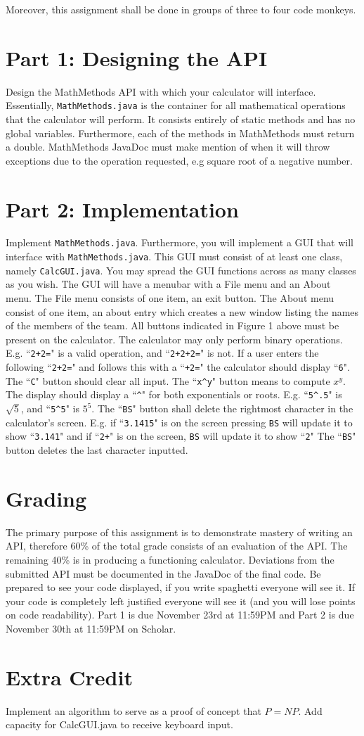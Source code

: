 \documentclass[]{simple}
\begin{document}
Moreover, this assignment shall be done in groups of three to four code monkeys.

\section{Part 1: Designing the API}
Design the MathMethods API with which your calculator will interface.
Essentially, \verb|MathMethods.java| is the container for all mathematical operations that the calculator will perform.
It consists entirely of static methods and has no global variables.
Furthermore, each of the methods in MathMethods must return a double.
MathMethods JavaDoc must make mention of when it will throw exceptions due to the operation requested, e.g square root of a negative number.

\section{Part 2: Implementation}
Implement \verb|MathMethods.java|.
Furthermore, you will implement a GUI that will interface with \verb|MathMethods.java|.
This GUI must consist of at least one class, namely \verb|CalcGUI.java|.
You may spread the GUI functions across as many classes as you wish.
The GUI will have a menubar with a File menu and an About menu.
The File menu consists of one item, an exit button.
The About menu consist of one item, an about entry which creates a new window listing the names of the members of the team.
All buttons indicated in Figure 1 above must be present on the calculator.
The calculator may only perform binary operations. 
E.g. ``\verb|2+2=|" is a valid operation, and ``\verb|2+2+2=|" is not.
If a user enters the following ``\verb|2+2=|" and follows this with a ``\verb|+2=|" the calculator should display ``\verb|6|".
The ``\verb|C|" button should clear all input.
The ``\verb|x^y|" button means to compute $x^y$.
The display should display a ``\verb|^|" for both exponentials or roots.
E.g. ``\verb|5^.5|" is $\sqrt{5}$, and ``\verb|5^5|" is $5^{5}$.
The ``\verb|BS|" button shall delete the rightmost character in the calculator's screen.
E.g. if ``\verb|3.1415|" is on the screen pressing \verb|BS| will update it to show ``\verb|3.141|" and if ``\verb|2+|" is on the screen, \verb|BS| will update it to show ``\verb|2|"
The ``\verb|BS|" button deletes the last character inputted.

\section {Grading}
The primary purpose of this assignment is to demonstrate mastery of writing an API, therefore 60\% of the total grade consists of an evaluation of the API.
The remaining 40\% is in producing a functioning calculator.
Deviations from the submitted API must be documented in the JavaDoc of the final code.
Be prepared to see your code displayed, if you write spaghetti everyone will see it.
If your code is completely left justified everyone will see it (and you will lose points on code readability).
Part 1 is due November 23rd at 11:59PM and Part 2 is due November 30th at 11:59PM on Scholar.

\section{Extra Credit}
Implement an algorithm to serve as a proof of concept that $P=NP$.
Add capacity for CalcGUI.java to receive keyboard input.
\end{document}
